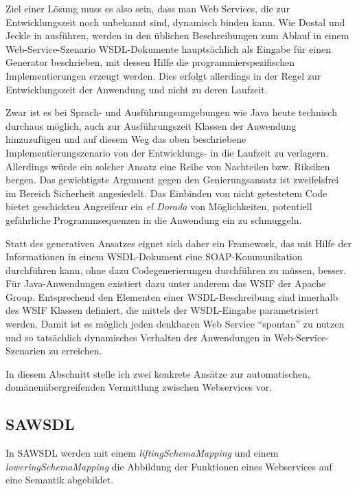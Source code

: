 Ziel einer Lösung muss es also sein, dass man Web Services, die zur Entwicklungszeit noch unbekannt sind, dynamisch binden kann. Wie Dostal und Jeckle in \cite[S.61]{xmlspek4} ausführen, werden in den üblichen Beschreibungen zum Ablauf in einem Web-Service-Szenario \ac{WSDL}-Dokumente hauptsächlich als Eingabe für einen Generator beschrieben, mit dessen Hilfe die programmierspezifischen Implementierungen erzeugt werden. Dies erfolgt allerdings in der Regel zur Entwicklungszeit der Anwendung und nicht zu deren Laufzeit.

Zwar ist es bei Sprach- und Ausführungsumgebungen wie Java heute technisch durchaus möglich, auch zur Ausführungszeit Klassen der Anwendung hinzuzufügen und auf diesem Weg das oben beschriebene Implementierungszenario von der Entwicklungs- in die Laufzeit zu verlagern. Allerdings würde ein solcher Ansatz eine Reihe von Nachteilen bzw. Riksiken bergen. Das gewichtigste Argument gegen den Genierungsansatz ist zweifelsfrei im Bereich Sicherheit angesiedelt. Das Einbinden von nicht getestetem Code bietet geschickten Angreifenr ein \emph{el Dorada} von Möglichkeiten, potentiell gefährliche Programmsequenzen in die Anwendung ein zu schmuggeln.

Statt des generativen Ansatzes eignet sich daher ein Framework, das mit Hilfe der Informationen in einem \ac{WSDL}-Dokument eine \ac{SOAP}-Kommunikation durchführen kann, ohne dazu Codegenerierungen durchführen zu müssen, besser. Für Java-Anwendungen existiert dazu unter anderem das \ac{WSIF} der Apache Group. Entsprechend den Elementen einer WSDL-Beschreibung sind innerhalb des \ac{WSIF} Klassen definiert, die mittels der \ac{WSDL}-Eingabe parametrisiert werden. Damit ist es möglich jeden denkbaren Web Service "`spontan"' zu nutzen und so tatsächlich dynamisches Verhalten der Anwendungen in Web-Service-Szenarien zu erreichen.



In diesem Abschnitt stelle ich zwei konkrete Ansätze zur automatischen, domänenübergreifenden Vermittlung zwischen Webservices vor.

\subsection{SAWSDL}

In \ac{SAWSDL} werden mit einem \emph{liftingSchemaMapping} und einem \emph{loweringSchemaMapping} die Abbildung der Funktionen eines Webservices auf eine Semantik abgebildet.

